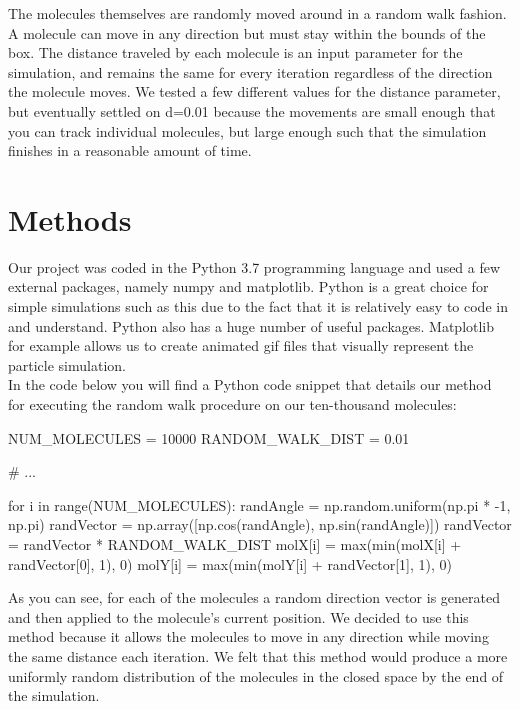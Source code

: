 \documentclass[12pt,a4paper]{article}
\begin{document}
	The molecules themselves are randomly moved around in a random walk fashion. A molecule can move in any direction but must stay within the bounds of the box. The distance traveled by each molecule is an input parameter for the simulation, and remains the same for every iteration regardless of the direction the molecule moves. We tested a few different values for the distance parameter, but eventually settled on d=0.01 because the movements are small enough that you can track individual molecules, but large enough such that the simulation finishes in a reasonable amount of time.
	
	\section{Methods}\label{methods}

	Our project was coded in the Python 3.7 programming language and used a few external packages, namely numpy and matplotlib. Python is a great choice for simple simulations such as this due to the fact that it is relatively easy to code in and understand. Python also has a huge number of useful packages. Matplotlib for example allows us to create animated gif files that visually represent the particle simulation.\\
	
	In the code below you will find a Python code snippet that details our method for executing the random walk procedure on our ten-thousand molecules:

	\begin{python}
	NUM_MOLECULES = 10000
	RANDOM_WALK_DIST = 0.01
	
	# ...
	
	for i in range(NUM_MOLECULES):
		randAngle = np.random.uniform(np.pi * -1, np.pi)
		randVector = np.array([np.cos(randAngle), np.sin(randAngle)])
		randVector = randVector * RANDOM_WALK_DIST
		molX[i] = max(min(molX[i] + randVector[0], 1), 0)
		molY[i] = max(min(molY[i] + randVector[1], 1), 0)
	\end{python}

	As you can see, for each of the molecules a random direction vector is generated and then applied to the molecule's current position. We decided to use this method because it allows the molecules to move in any direction while moving the same distance each iteration. We felt that this method would produce a more uniformly random distribution of the molecules in the closed space by the end of the simulation.\\
	
\end{document}
